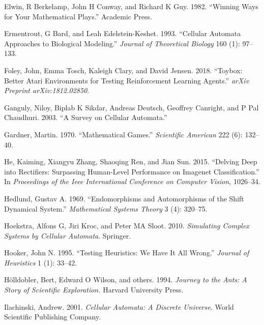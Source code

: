 \documentclass[
  12pt,
  openany]{book}
\newlength{\cslhangindent}
\newenvironment{cslreferences}%
  {\setlength{\parindent}{0pt}%
  \everypar{\setlength{\hangindent}{\cslhangindent}}\ignorespaces}%
  {\par}
\begin{document}
\begin{cslreferences}
\leavevmode\hypertarget{ref-elwin1982winning}{}%
Elwin, R Berkelamp, John H Conway, and Richard K Guy. 1982. ``Winning Ways for Your Mathematical Plays.'' Academic Press.

\leavevmode\hypertarget{ref-ermentrout1993cellular}{}%
Ermentrout, G Bard, and Leah Edelstein-Keshet. 1993. ``Cellular Automata Approaches to Biological Modeling.'' \emph{Journal of Theoretical Biology} 160 (1): 97--133.

\leavevmode\hypertarget{ref-foley2018toybox}{}%
Foley, John, Emma Tosch, Kaleigh Clary, and David Jensen. 2018. ``Toybox: Better Atari Environments for Testing Reinforcement Learning Agents.'' \emph{arXiv Preprint arXiv:1812.02850}.

\leavevmode\hypertarget{ref-ganguly2003survey}{}%
Ganguly, Niloy, Biplab K Sikdar, Andreas Deutsch, Geoffrey Canright, and P Pal Chaudhuri. 2003. ``A Survey on Cellular Automata.''

\leavevmode\hypertarget{ref-gardner1970mathematical}{}%
Gardner, Martin. 1970. ``Mathematical Games.'' \emph{Scientific American} 222 (6): 132--40.

\leavevmode\hypertarget{ref-he2015delving}{}%
He, Kaiming, Xiangyu Zhang, Shaoqing Ren, and Jian Sun. 2015. ``Delving Deep into Rectifiers: Surpassing Human-Level Performance on Imagenet Classification.'' In \emph{Proceedings of the Ieee International Conference on Computer Vision}, 1026--34.

\leavevmode\hypertarget{ref-hedlund1969endomorphisms}{}%
Hedlund, Gustav A. 1969. ``Endomorphisms and Automorphisms of the Shift Dynamical System.'' \emph{Mathematical Systems Theory} 3 (4): 320--75.

\leavevmode\hypertarget{ref-hoekstra2010simulating}{}%
Hoekstra, Alfons G, Jiri Kroc, and Peter MA Sloot. 2010. \emph{Simulating Complex Systems by Cellular Automata}. Springer.

\leavevmode\hypertarget{ref-hooker1995testing}{}%
Hooker, John N. 1995. ``Testing Heuristics: We Have It All Wrong.'' \emph{Journal of Heuristics} 1 (1): 33--42.

\leavevmode\hypertarget{ref-holldobler1994journey}{}%
Hölldobler, Bert, Edward O Wilson, and others. 1994. \emph{Journey to the Ants: A Story of Scientific Exploration.} Harvard University Press.

\leavevmode\hypertarget{ref-ilachinski2001cellular}{}%
Ilachinski, Andrew. 2001. \emph{Cellular Automata: A Discrete Universe}. World Scientific Publishing Company.


\end{cslreferences}
\end{document}
